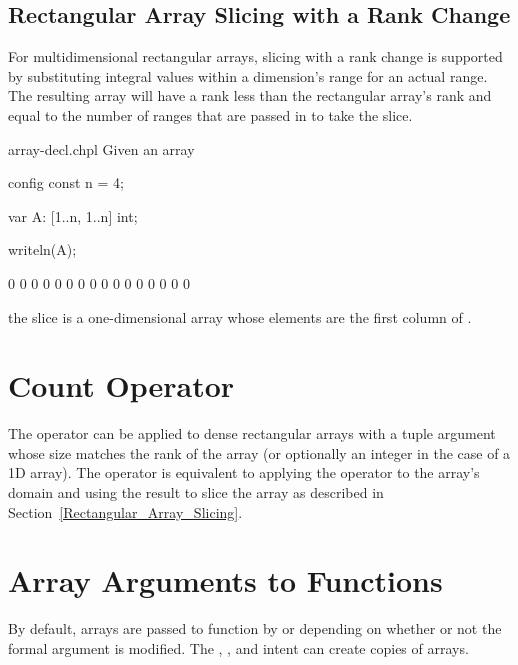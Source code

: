 \subsection{Rectangular Array Slicing with a Rank Change}
\label{Rectangular_Array_Slicing_With_Rank_Change}

For multidimensional rectangular arrays, slicing with a rank change is
supported by substituting integral values within a dimension's range
for an actual range.  The resulting array will have a rank less than
the rectangular array's rank and equal to the number of ranges that are
passed in to take the slice.

\begin{chapelexample}{array-decl.chpl}
Given an array
\begin{chapelpre}
config const n = 4;
\end{chapelpre}
\begin{chapel}
var A: [1..n, 1..n] int;
\end{chapel}
\begin{chapelpost}
writeln(A);
\end{chapelpost}
\begin{chapeloutput}
0 0 0 0
0 0 0 0
0 0 0 0
0 0 0 0
\end{chapeloutput}
the slice  is a one-dimensional array whose elements
are the first column of .
\end{chapelexample}


\section{Count Operator}
\label{Count_Operator_Arrays}
The \chpl{#} operator can be applied to dense rectangular arrays with
a tuple argument whose size matches the rank of the array (or
optionally an integer in the case of a 1D array).  The operator is
equivalent to applying the \chpl{#} operator to the array's domain and
using the result to slice the array as described in
Section~\ref{Rectangular_Array_Slicing}.


\section{Array Arguments to Functions}
\label{Array_Arguments_To_Functions}

By default, arrays are passed to function by  or  depending on whether or not the formal argument is modified. The
, , and  intent can create copies of
arrays.

